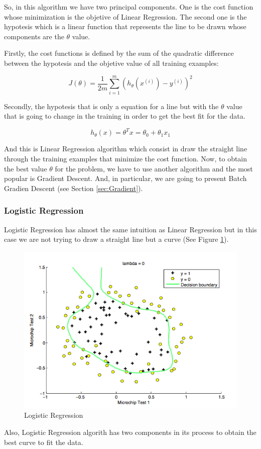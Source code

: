 \documentclass[12pt]{article}
\begin{document}
So, in this algorithm we have two principal components. One is the cost function whose minimization is the objetive of Linear Regression. The second one is the hypotesis which is a linear function that represents the line to be drawn whose components are the $\theta$ value. 

Firstly, the cost functions is defined by the sum of the quadratic difference between the hypotesis and the objetive value of all training examples:

\begin{equation}
  J(\theta)=\frac{1}{2m} \displaystyle\sum_{i=1}^{m} (h_{\theta}(x^{(i)})-y^{(i)})^2
\end{equation}

Secondly, the hypotesis that is only a equation for a line but with the $\theta$ value that is going to change in the training in order to get the best fit for the data.

\begin{equation}
  h_{\theta}(x)=\theta^Tx=\theta_{0}+\theta_{1}x_{1}
\end{equation}

And this is Linear Regression algorithm which consist in draw the straight line through the training examples that minimize the cost function. Now, to obtain the best value $\theta$ for the problem, we have to use another algorithm and the most popular is Gradient Descent. And, in particular, we are going to present Batch Gradien Descent (see Section \ref{sec:Gradient}).

\subsubsection{Logistic Regression}
Logistic Regression has almost the same intuition as Linear Regression but in this case we are not trying to draw a straight line but a curve (See Figure \ref{fig:figure4}).
\begin{figure}[ht]
\centering
\includegraphics[width=.6\textwidth]{Logistic.png}
\caption{Logistic Regression}
\label{fig:figure4}
\end{figure}
Also, Logistic Regression algorith has two components in its process to obtain the best curve to fit the data.
\end{document}
